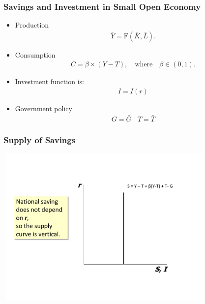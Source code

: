 \documentclass[handout]{beamer}
\begin{document}

\begin{frame}[t]
\frametitle{Savings and Investment in Small Open Economy}
\begin{itemize}
\item Production
\begin{eqnarray*}
\bar Y = \mbox{F}(\bar K, \bar L).
\end{eqnarray*}
\item Consumption
\begin{eqnarray*}
C = \beta \times (Y - T), \quad \mbox{where} \quad \beta \in (0,1).
\end{eqnarray*}
\item Investment function is:
\begin{eqnarray*}
I = I(r)
\end{eqnarray*}
\item Government policy
\begin{eqnarray*}
G = \bar G \ \ \ \ T = \bar T
\end{eqnarray*}
\end{itemize}
\end{frame}


\begin{frame}[t]
\frametitle{Supply of Savings}
\begin{center}
\includegraphics[height=3.1in,width=4.25in]{savins_funds.pdf}
\end{center}
\end{frame}
\end{document}
